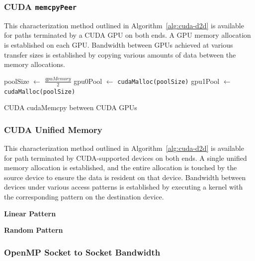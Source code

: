 \subsubsection{CUDA \texttt{memcpyPeer}}

This characterization method outlined in Algorithm~\ref{alg:cuda-d2d} is available for paths terminated by a CUDA GPU on both ends.
A GPU memory allocation is established on each GPU.
Bandwidth between GPUs achieved at various transfer sizes is established by copying various amounts of data between the memory allocations.

\begin{algorithm}[ht]
    \SetAlgoLined
    poolSize $\gets$ $\frac{gpuMemory}{2}$\;
    gpu0Pool $\gets$ \texttt{cudaMalloc(poolSize)}\;
    gpu1Pool $\gets$ \texttt{cudaMalloc(poolSize)}\;
    \caption{CUDA cudaMemcpy between CUDA GPUs}
    \label{alg:cuda-p2p}
\end{algorithm}


\subsubsection{CUDA Unified Memory}

This characterization method outlined in Algorithm~\ref{alg:cuda-d2d} is available for path terminated by CUDA-supported devices on both ends.
A single unified memory allocation is established, and the entire allocation is touched by the source device to ensure the data is resident on that device.
Bandwidth between devices under various access patterns is established by executing a kernel with the corresponding pattern on the destination device.

\textbf{Linear Pattern}


\textbf{Random Pattern}



\subsubsection{OpenMP Socket to Socket Bandwidth}

